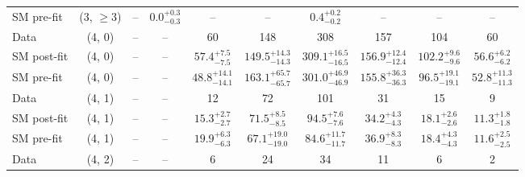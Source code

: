 {\begin{table}[h!]
{\begin{tabular}{lccccccccc}
    SM pre-fit  & (3, $\ge3$)      & --                            & $0.0^{+ 0.3 }_{- 0.3 }$       & --                          & --                          & $0.4^{+ 0.2 }_{- 0.2 }$     & --                          & --                         & --                         \\[0.5ex] 
    Data        & (4, 0)           & --                            & --                            & 60                          & 148                         & 308                         & 157                         & 104                        & 60                         \\[0.5ex] 
    SM post-fit & (4, 0)           & --                            & --                            & $57.4^{+ 7.5 }_{- 7.5 }$    & $149.5^{+ 14.3 }_{- 14.3 }$ & $309.1^{+ 16.5 }_{- 16.5 }$ & $156.9^{+ 12.4 }_{- 12.4 }$ & $102.2^{+ 9.6 }_{- 9.6 }$  & $56.6^{+ 6.2 }_{- 6.2 }$   \\[0.5ex] 
    SM pre-fit  & (4, 0)           & --                            & --                            & $48.8^{+ 14.1 }_{- 14.1 }$  & $163.1^{+ 65.7 }_{- 65.7 }$ & $301.0^{+ 46.9 }_{- 46.9 }$ & $155.8^{+ 36.3 }_{- 36.3 }$ & $96.5^{+ 19.1 }_{- 19.1 }$ & $52.8^{+ 11.3 }_{- 11.3 }$ \\[0.5ex] 
    Data        & (4, 1)           & --                            & --                            & 12                          & 72                          & 101                         & 31                          & 15                         & 9                          \\[0.5ex] 
    SM post-fit & (4, 1)           & --                            & --                            & $15.3^{+ 2.7 }_{- 2.7 }$    & $71.5^{+ 8.5 }_{- 8.5 }$    & $94.5^{+ 7.6 }_{- 7.6 }$    & $34.2^{+ 4.3 }_{- 4.3 }$    & $18.1^{+ 2.6 }_{- 2.6 }$   & $11.3^{+ 1.8 }_{- 1.8 }$   \\[0.5ex] 
    SM pre-fit  & (4, 1)           & --                            & --                            & $19.9^{+ 6.3 }_{- 6.3 }$    & $67.1^{+ 19.0 }_{- 19.0 }$  & $84.6^{+ 11.7 }_{- 11.7 }$  & $36.9^{+ 8.3 }_{- 8.3 }$    & $18.4^{+ 4.3 }_{- 4.3 }$   & $11.6^{+ 2.5 }_{- 2.5 }$   \\[0.5ex] 
    Data        & (4, 2)           & --                            & --                            & 6                           & 24                          & 34                          & 11                          & 6                          & 2                          \\[0.5ex] 

\end{tabular}}
\end{table}}
